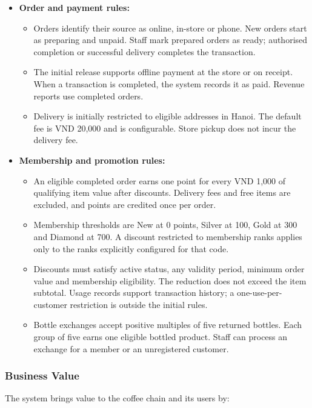 \begin{itemize}
  \item \textbf{Order and payment rules:}
  \begin{itemize}
    \item Orders identify their source as online, in-store or phone. New orders start as preparing and unpaid. Staff mark prepared orders as ready; authorised completion or successful delivery completes the transaction.
    \item The initial release supports offline payment at the store or on receipt. When a transaction is completed, the system records it as paid. Revenue reports use completed orders.
    \item Delivery is initially restricted to eligible addresses in Hanoi. The default fee is VND 20,000 and is configurable. Store pickup does not incur the delivery fee.
  \end{itemize}
  \item \textbf{Membership and promotion rules:}
  \begin{itemize}
    \item An eligible completed order earns one point for every VND 1,000 of qualifying item value after discounts. Delivery fees and free items are excluded, and points are credited once per order.
    \item Membership thresholds are New at 0 points, Silver at 100, Gold at 300 and Diamond at 700. A discount restricted to membership ranks applies only to the ranks explicitly configured for that code.
    \item Discounts must satisfy active status, any validity period, minimum order value and membership eligibility. The reduction does not exceed the item subtotal. Usage records support transaction history; a one-use-per-customer restriction is outside the initial rules.
    \item Bottle exchanges accept positive multiples of five returned bottles. Each group of five earns one eligible bottled product. Staff can process an exchange for a member or an unregistered customer.
  \end{itemize}
\end{itemize}

\subsubsection{Business Value}

The system brings value to the coffee chain and its users by:

